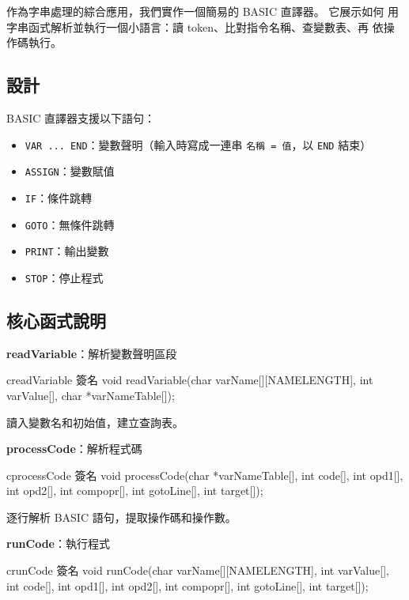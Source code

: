 作為字串處理的綜合應用，我們實作一個簡易的 BASIC 直譯器。 它展示如何
用字串函式解析並執行一個小語言：讀 token、比對指令名稱、查變數表、再
依操作碼執行。

\subsection{設計}

BASIC 直譯器支援以下語句：
\begin{itemize}
\item \texttt{VAR ... END}：變數聲明（輸入時寫成一連串
      \texttt{名稱 = 值}，以 \texttt{END} 結束）
\item \texttt{ASSIGN}：變數賦值
\item \texttt{IF}：條件跳轉
\item \texttt{GOTO}：無條件跳轉
\item \texttt{PRINT}：輸出變數
\item \texttt{STOP}：停止程式
\end{itemize}

\subsection{核心函式說明}

\textbf{readVariable}：解析變數聲明區段

\begin{code}{c}{readVariable 簽名}
void readVariable(char varName[][NAMELENGTH],
                  int varValue[],
                  char *varNameTable[]);
\end{code}

讀入變數名和初始值，建立查詢表。

\textbf{processCode}：解析程式碼

\begin{code}{c}{processCode 簽名}
void processCode(char *varNameTable[],
                 int code[], int opd1[],
                 int opd2[], int compopr[],
                 int gotoLine[],
                 int target[]);
\end{code}

逐行解析 BASIC 語句，提取操作碼和操作數。

\textbf{runCode}：執行程式

\begin{code}{c}{runCode 簽名}
void runCode(char varName[][NAMELENGTH],
             int varValue[], int code[],
             int opd1[], int opd2[],
             int compopr[], int gotoLine[],
             int target[]);
\end{code}

